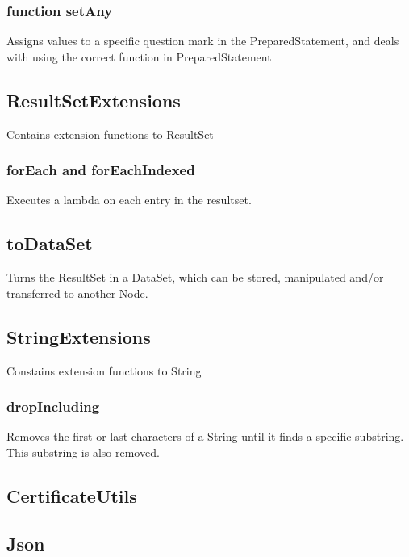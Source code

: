 \documentclass{article}
\begin{document}
\subsubsection{function setAny}
Assigns values to a specific question mark in the PreparedStatement, and deals with using the correct function in PreparedStatement
\subsection{ResultSetExtensions}
Contains extension functions to ResultSet
\subsubsection{forEach and forEachIndexed}
Executes a lambda on each entry in the resultset. 
\subsection{toDataSet}
Turns the ResultSet in a DataSet, which can be stored, manipulated and/or transferred to another Node.
\subsection{StringExtensions}
Constains extension functions to String
\subsubsection{dropIncluding}
Removes the first or last characters of a String until it finds a specific substring. This substring is also removed.
\subsection{CertificateUtils}
\subsection{Json}
\end{document}
